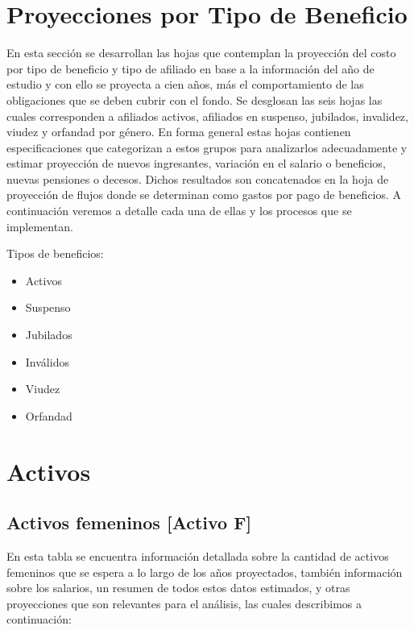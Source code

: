 \documentclass[
  letterpaper,
  DIV=11,
  numbers=noendperiod]{scrreprt}
\providecommand{\tightlist}{%
  \setlength{\itemsep}{0pt}\setlength{\parskip}{0pt}}\usepackage{longtable,booktabs,array}
\begin{document}

\hypertarget{proyecciones-por-tipo-de-beneficio}{%
\chapter{Proyecciones por Tipo de
Beneficio}\label{proyecciones-por-tipo-de-beneficio}}

En esta sección se desarrollan las hojas que contemplan la proyección
del costo por tipo de beneficio y tipo de afiliado en base a la
información del año de estudio y con ello se proyecta a cien años, más
el comportamiento de las obligaciones que se deben cubrir con el fondo.
Se desglosan las seis hojas las cuales corresponden a afiliados activos,
afiliados en suspenso, jubilados, invalidez, viudez y orfandad por
género. En forma general estas hojas contienen especificaciones que
categorizan a estos grupos para analizarlos adecuadamente y estimar
proyección de nuevos ingresantes, variación en el salario o beneficios,
nuevas pensiones o decesos. Dichos resultados son concatenados en la
hoja de proyección de flujos donde se determinan como gastos por pago de
beneficios. A continuación veremos a detalle cada una de ellas y los
procesos que se implementan.

Tipos de beneficios:

\begin{itemize}
\tightlist
\item
  Activos
\item
  Suspenso
\item
  Jubilados
\item
  Inválidos
\item
  Viudez
\item
  Orfandad
\end{itemize}


\hypertarget{activos}{%
\chapter{Activos}\label{activos}}

\hypertarget{activos-femeninos-activo-f}{%
\section{Activos femeninos {[}Activo
F{]}}\label{activos-femeninos-activo-f}}

En esta tabla se encuentra información detallada sobre la cantidad de
activos femeninos que se espera a lo largo de los años proyectados,
también información sobre los salarios, un resumen de todos estos datos
estimados, y otras proyecciones que son relevantes para el análisis, las
cuales describimos a continuación:
\end{document}
